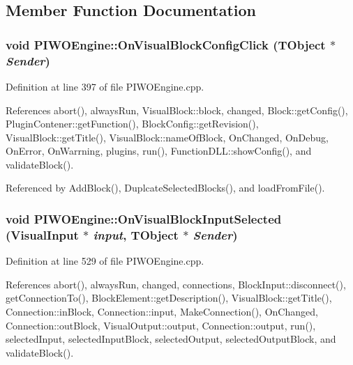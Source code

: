 \subsection{Member Function Documentation}
\hypertarget{classPIWOEngine_97f4f39393b6fc49fe33b867b46b9564}{
\subsubsection[OnVisualBlockConfigClick]{\setlength{\rightskip}{0pt plus 5cm}void PIWOEngine::OnVisualBlockConfigClick (TObject $\ast$ {\em Sender})}}
\label{classPIWOEngine_97f4f39393b6fc49fe33b867b46b9564}




Definition at line 397 of file PIWOEngine.cpp.

References abort(), alwaysRun, VisualBlock::block, changed, Block::getConfig(), PluginContener::getFunction(), BlockConfig::getRevision(), VisualBlock::getTitle(), VisualBlock::nameOfBlock, OnChanged, OnDebug, OnError, OnWarrning, plugins, run(), FunctionDLL::showConfig(), and validateBlock().

Referenced by AddBlock(), DuplcateSelectedBlocks(), and loadFromFile().\hypertarget{classPIWOEngine_4e51d927289a1bcb9dc8f1153d457e93}{
\subsubsection[OnVisualBlockInputSelected]{\setlength{\rightskip}{0pt plus 5cm}void PIWOEngine::OnVisualBlockInputSelected ({\bf VisualInput} $\ast$ {\em input}, \/  TObject $\ast$ {\em Sender})}}
\label{classPIWOEngine_4e51d927289a1bcb9dc8f1153d457e93}




Definition at line 529 of file PIWOEngine.cpp.

References abort(), alwaysRun, changed, connections, BlockInput::disconnect(), getConnectionTo(), BlockElement::getDescription(), VisualBlock::getTitle(), Connection::inBlock, Connection::input, MakeConnection(), OnChanged, Connection::outBlock, VisualOutput::output, Connection::output, run(), selectedInput, selectedInputBlock, selectedOutput, selectedOutputBlock, and validateBlock().


